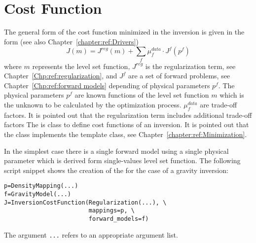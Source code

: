 \chapter{Cost Function}\label{chapter:ref:inversion cost function}
The general form of the cost function minimized in the inversion is given in the form (see also Chapter~\ref{chapter:ref:Drivers})
\begin{equation}\label{REF:EQU:DRIVE:10}
J(m) = J^{reg}(m) + \sum_{f} \mu^{data}_{f} \cdot J^{f}(p^f)
\end{equation} 
where $m$ represents the level set function, $J^{reg}$ is the regularization term, see Chapter~\ref{Chp:ref:regularization},
and $J^{f}$ are a set of forward problems, see Chapter~\ref{Chp:ref:forward models} depending of 
physical parameters $p^f$.  The physical parameters $p^f$ are known functions 
of the  level set function $m$ which is the unknown to be calculated by the optimization process. 
$\mu^{data}_{f}$ are trade-off factors. It is pointed out that the regularization term includes additional trade-off factors 
The  is class to define cost functions of an inversion. It is pointed out that
the  class implements the  template class, see Chapter~\ref{chapter:ref:Minimization}.

In the simplest case there is a single forward model using a single physical parameter which is 
derived form single-values level set function. The following script snippet shows the creation of the
 for the case of a gravity inversion:
\begin{verbatim}
p=DensityMapping(...)
f=GravityModel(...)
J=InversionCostFunction(Regularization(...), \
                        mappings=p, \
                        forward_models=f)
\end{verbatim}
The argument \verb|...| refers to an appropriate argument list.

